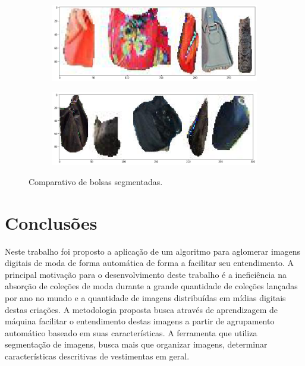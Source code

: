 \documentclass[12pt]{report}
\begin{document}
\begin{figure}
  \centering
  \begin{subfigure}[b]{\textwidth}
  \centering
    \includegraphics[scale=0.4]{images/resultados/compabolsa.png}
    \label{fig:}
  \end{subfigure}
  \centering
  \begin{subfigure}[b]{\textwidth}
  \centering
    \includegraphics[scale=0.4]{images/resultados/compabolsas2.png}
    \label{fig:}
  \end{subfigure}
  \caption{Comparativo de bolsas segmentadas.}
  \label{fig:compabolsa}
\end{figure}




\chapter{Conclusões}
\label{cha:conclusoes}

Neste trabalho foi proposto a aplicação de um algoritmo para aglomerar imagens digitais de moda de forma automática de forma a facilitar seu entendimento. A principal motivação para o desenvolvimento deste trabalho é a ineficiência na absorção de coleções de moda durante a grande quantidade de coleções lançadas por ano no mundo e a quantidade de imagens distribuídas em mídias digitais destas criações. A metodologia proposta busca através de aprendizagem de máquina facilitar o entendimento destas imagens a partir de agrupamento automático baseado em suas características. A ferramenta que utiliza segmentação de imagens, busca mais que organizar imagens, determinar características descritivas de vestimentas em geral.
\end{document}
